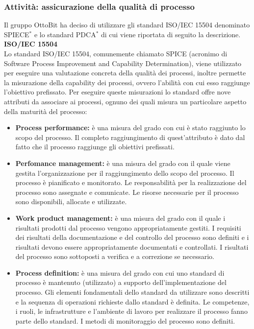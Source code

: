 \documentclass[11pt,a4paper]{article}
\begin{document}
{	\subsubsection{Attività: assicurazione della qualità di processo}
	Il gruppo OttoBit ha deciso di utilizzare gli standard ISO/IEC 15504 denominato SPIECE$^*$ e lo standard PDCA$^*$ di cui viene riportata di seguito la descrizione.\\
	\textbf{ISO/IEC 15504} \\
	Lo standard ISO/IEC 15504, comunemente chiamato SPICE (acronimo di Software Process Improvement and Capability Determination), viene utilizzato per eseguire una valutazione concreta della qualità dei processi, inoltre permette la misurazione della capability dei processi, ovvero l'abilità con cui esso raggiunge l'obiettivo prefissato. Per eseguire queste misurazioni lo standard offre nove attributi da associare ai processi, ognuno dei quali misura un particolare aspetto della maturità del processo:
	\begin{itemize}
	\item \textbf{Process performance:} è una misura del grado con cui è stato raggiunto lo scopo del processo. Il completo raggiungimento di quest'attributo è dato dal fatto che il processo raggiunge gli obiettivi prefissati.
	\item \textbf{Perfomance management:} è una misura del grado con il quale viene gestita l'organizzazione per il raggiungimento dello scopo del processo. Il processo è pianificato e monitorato. Le responsabilità per la realizzazione del processo sono assegnate e comunicate. Le risorse necessarie per il processo sono disponibili, allocate e utilizzate. 
	\item \textbf{Work product management:} è una misura del grado con il quale i risultati prodotti dal processo vengono appropriatamente gestiti. I requisiti dei risultati della documentazione e del controllo del processo sono definiti e i risultati devono essere appropriatamente documentati e controllati. I risultati del processo sono sottoposti a verifica e a correzione se necessario.
	\item \textbf{Process definition:} è una misura del grado con cui uno standard di processo è mantenuto (utilizzato) a supporto dell'implementazione del processo. Gli elementi fondamentali dello standard da utilizzare sono descritti e la sequenza di operazioni richieste dallo standard è definita. Le competenze, i ruoli, le infrastrutture e l'ambiente di lavoro per realizzare il processo fanno parte dello standard. I metodi di monitoraggio del processo sono definiti.

\end{itemize}}
\end{document}
